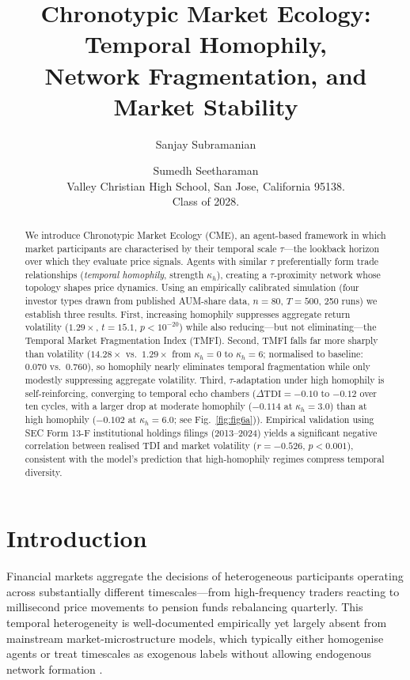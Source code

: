 \documentclass[10pt,twocolumn]{article}
\title{\textbf{Chronotypic Market Ecology: Temporal Homophily,\\
Network Fragmentation, and Market Stability}}
\author{Sanjay Subramanian \and Sumedh Seetharaman\\
\small Valley Christian High School, San Jose, California 95138.\\
\small Class of 2028.}
\date{}
\begin{document}
\maketitle

\begin{abstract}
We introduce Chronotypic Market Ecology (CME), an agent-based framework in
which market participants are characterised by their temporal scale
$\tau$---the lookback horizon over which they evaluate price signals.
Agents with similar $\tau$ preferentially form trade relationships
(\emph{temporal homophily}, strength $\kappa_h$), creating a
$\tau$-proximity network whose topology shapes price dynamics.
Using an empirically calibrated simulation (four investor types drawn
from published AUM-share data, $n=80$, $T=500$, 250 runs) we establish
three results.
First, increasing homophily suppresses aggregate return volatility
($1.29\times$, $t=15.1$, $p<10^{-20}$) while also reducing---but not
eliminating---the Temporal Market Fragmentation Index (TMFI).
Second, TMFI falls far more sharply than volatility ($14.28\times$
vs.\ $1.29\times$ from $\kappa_h=0$ to $\kappa_h=6$; normalised to
baseline: $0.070$ vs.\ $0.760$), so homophily nearly eliminates
temporal fragmentation while only modestly suppressing aggregate
volatility.
Third, $\tau$-adaptation under high homophily is self-reinforcing,
converging to temporal echo chambers ($\Delta\mathrm{TDI} = {-0.10}$
to ${-0.12}$ over ten cycles, with a larger drop at moderate homophily ($-0.114$ at $\kappa_h=3.0$) than at high homophily ($-0.102$ at $\kappa_h=6.0$; see Fig.~\ref{fig:fig6a})).
Empirical validation using SEC Form 13-F institutional holdings filings (2013--2024)
yields a significant negative correlation between realised TDI and
market volatility ($r = -0.526$, $p < 0.001$), consistent with the
model's prediction that high-homophily regimes compress temporal diversity.
\end{abstract}

\section{Introduction}

Financial markets aggregate the decisions of heterogeneous participants
operating across substantially different timescales---from high-frequency
traders reacting to millisecond price movements to pension funds rebalancing
quarterly.  This temporal heterogeneity is well-documented empirically
\cite{ref1,ref2} yet largely absent from mainstream market-microstructure
models, which typically either homogenise agents or treat timescales as
exogenous labels without allowing endogenous network formation
\cite{lebaron2001,farmerfoley2009}.
\end{document}
